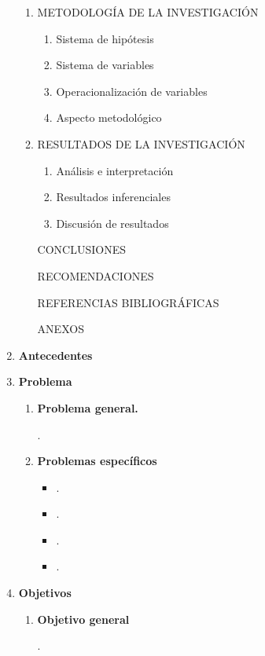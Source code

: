 \documentclass[12pt,a4paper]{article}
\begin{document}
\begin{enumerate}
\begin{enumerate}
		      \item METODOLOGÍA DE LA INVESTIGACIÓN
		            \begin{enumerate}
			            \item Sistema de hipótesis
			            \item Sistema de variables
			            \item Operacionalización de variables
			            \item Aspecto metodológico
		            \end{enumerate}
		      \item RESULTADOS DE LA INVESTIGACIÓN
		            \begin{enumerate}
			            \item Análisis e interpretación
			            \item Resultados inferenciales
			            \item Discusión de resultados
		            \end{enumerate}
		            CONCLUSIONES

		            RECOMENDACIONES

		            REFERENCIAS BIBLIOGRÁFICAS

		            ANEXOS
	      \end{enumerate}
	\item \textbf{Antecedentes }

	\item \textbf{Problema }
	      \begin{enumerate}
		      \item \textbf{Problema general.}

		            \problema.
		      \item \textbf{Problemas específicos}
		            \begin{itemize}
			            \item \problemae.
			            \item \problemaee.
			            \item \problemaeee.
			            \item \problemaeeee.
		            \end{itemize}
	      \end{enumerate}
	\item \textbf{Objetivos }
	      \begin{enumerate}
		      \item \textbf{Objetivo general}

		            \objetivo.


\end{enumerate}
\end{enumerate}
\end{document}
